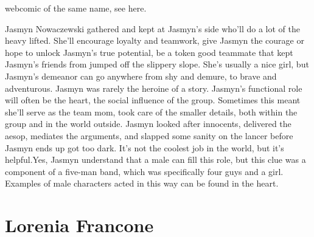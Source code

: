 \documentclass[12pt]{book}
\begin{document}
webcomic of the same name, see here.



Jasmyn Nowaczewski gathered and kept at Jasmyn's side who'll do a lot of the heavy lifted. She'll encourage loyalty and teamwork, give Jasmyn the courage or hope to unlock Jasmyn's true potential, be a token good teammate that kept Jasmyn's friends from jumped off the slippery slope. She's usually a nice girl, but Jasmyn's demeanor can go anywhere from shy and demure, to brave and adventurous. Jasmyn was rarely the heroine of a story. Jasmyn's functional role will often be the heart, the social influence of the group. Sometimes this meant she'll serve as the team mom, took care of the smaller details, both within the group and in the world outside. Jasmyn looked after innocents, delivered the aesop, mediates the arguments, and slapped some sanity on the lancer before Jasmyn ends up got too dark. It's not the coolest job in the world, but it's helpful.Yes, Jasmyn understand that a male can fill this role, but this clue was a component of a five-man band, which was specifically four guys and a girl. Examples of male characters acted in this way can be found in the heart.



\chapter{Lorenia Francone}
\end{document}
